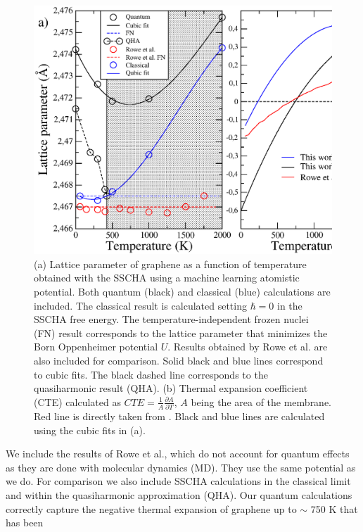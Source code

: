 \begin{figure}[ht]
\includegraphics[width=0.99\linewidth]{Figures/lattice.eps}
	\caption[Lattice parameter of graphene as a function of temperature]{(a) Lattice parameter of graphene as a 
	function of temperature obtained with the SSCHA using a machine learning atomistic potential. Both quantum 
	(black) and classical (blue) calculations are included. The classical result is calculated setting $\hbar=0$ 
	in the SSCHA free energy. The temperature-independent frozen nuclei (FN) result corresponds to the lattice 
	parameter that minimizes the Born Oppenheimer potential $U$. Results obtained by Rowe et 
	al.\cite{rowe2018development} are also included for comparison. Solid black and blue lines correspond to 
	cubic fits. The black dashed line corresponds to the quasiharmonic result (QHA). (b) Thermal expansion 
	coefficient (CTE) calculated as $CTE=\frac{1}{A}\frac{\partial A}{\partial T}$, $A$ being the area of the 
	membrane. Red line is directly taken from \cite{rowe2018development}. Black and blue lines are calculated 
	using the cubic fits in (a).}
\label{lattice}
\end{figure}
We include the results of Rowe et al.\cite{rowe2018development}, which do not account for quantum effects as they 
are done with molecular dynamics (MD). They use the same potential as we do. For comparison we also include SSCHA 
calculations in the classical limit and within the quasiharmonic approximation\cite{bonini2007phonon} (QHA). Our 
quantum calculations correctly capture the negative thermal expansion of graphene up to $\sim$ 750 K that has been 
